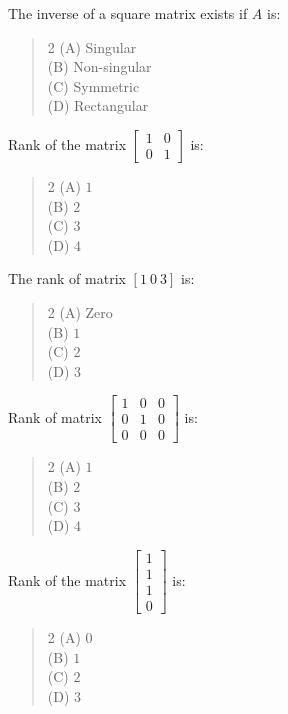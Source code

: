 \documentclass[11pt,a4paper]{article}
\begin{document}
\begin{mcqlist}
\item The inverse of a square matrix exists if $A$ is:
\begin{quote}\begin{multicols}{2}
\noindent (A) Singular \\
(B) Non-singular \\
(C) Symmetric \\
(D) Rectangular
\end{multicols}\end{quote}

\item Rank of the matrix $\begin{bmatrix}1&0\\0&1\end{bmatrix}$ is:
\begin{quote}\begin{multicols}{2}
\noindent (A) $1$ \\
(B) $2$ \\
(C) $3$ \\
(D) $4$
\end{multicols}\end{quote}

\item The rank of matrix $[1\ 0\ 3]$ is:
\begin{quote}\begin{multicols}{2}
\noindent (A) Zero \\
(B) $1$ \\
(C) $2$ \\
(D) $3$
\end{multicols}\end{quote}

\item Rank of matrix $\begin{bmatrix}1&0&0\\0&1&0\\0&0&0\end{bmatrix}$ is:
\begin{quote}\begin{multicols}{2}
\noindent (A) $1$ \\
(B) $2$ \\
(C) $3$ \\
(D) $4$
\end{multicols}\end{quote}

\item Rank of the matrix $\begin{bmatrix}1\\1\\1\\0\end{bmatrix}$ is:
\begin{quote}\begin{multicols}{2}
\noindent (A) $0$ \\
(B) $1$ \\
(C) $2$ \\
(D) $3$
\end{multicols}\end{quote}


\end{mcqlist}
\end{document}
